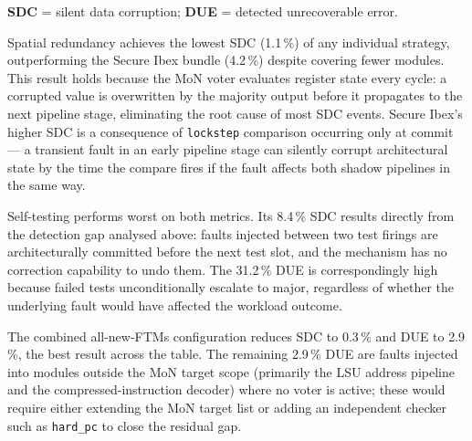 \noindent\textbf{SDC} = silent data corruption; \textbf{DUE} = detected unrecoverable error.

Spatial redundancy achieves the lowest SDC (1.1\,\%) of any individual strategy, outperforming
the Secure Ibex bundle (4.2\,\%) despite covering fewer modules. This result holds because the
MoN voter evaluates register state every cycle: a corrupted value is overwritten by the majority
output before it propagates to the next pipeline stage, eliminating the root cause of most SDC
events. Secure Ibex's higher SDC is a consequence of \texttt{lockstep} comparison occurring only
at commit — a transient fault in an early pipeline stage can silently corrupt architectural state
by the time the compare fires if the fault affects both shadow pipelines in the same way.

Self-testing performs worst on both metrics. Its 8.4\,\% SDC results directly from the detection
gap analysed above: faults injected between two test firings are architecturally committed before
the next test slot, and the mechanism has no correction capability to undo them. The 31.2\,\%
DUE is correspondingly high because failed tests unconditionally escalate to major, regardless of
whether the underlying fault would have affected the workload outcome.

The combined all-new-\acp{FTM} configuration reduces SDC to 0.3\,\% and DUE to 2.9\,\%, the
best result across the table. The remaining 2.9\,\% DUE are faults injected into modules
outside the MoN target scope (primarily the LSU address pipeline and the compressed-instruction
decoder) where no voter is active; these would require either extending the MoN target list or
adding an independent checker such as \texttt{hard\_pc} to close the residual gap.